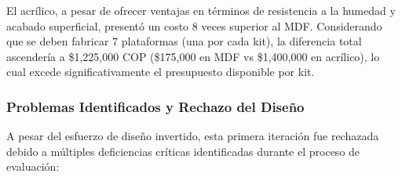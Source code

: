 El acrílico, a pesar de ofrecer ventajas en términos de resistencia a la humedad y acabado superficial, presentó un costo 8 veces superior al MDF. Considerando que se deben fabricar 7 plataformas (una por cada kit), la diferencia total ascendería a \$1,225,000 COP (\$175,000 en MDF vs \$1,400,000 en acrílico), lo cual excede significativamente el presupuesto disponible por kit.

\subsubsection{Problemas Identificados y Rechazo del Diseño}

A pesar del esfuerzo de diseño invertido, esta primera iteración fue rechazada debido a múltiples deficiencias críticas identificadas durante el proceso de evaluación:

